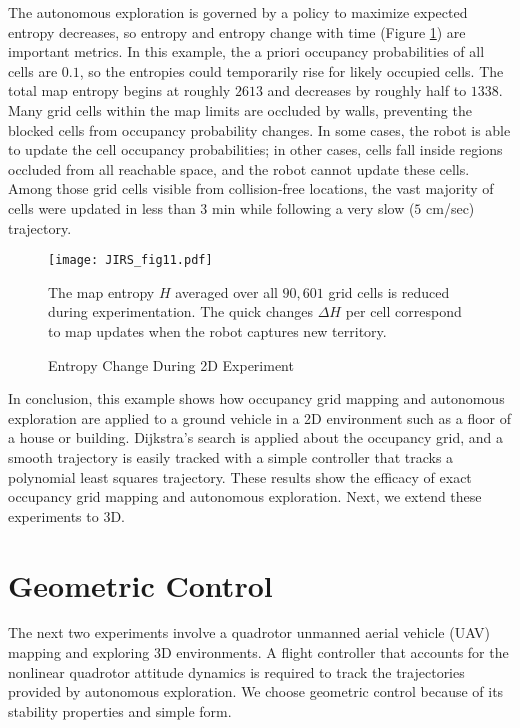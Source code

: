 The autonomous exploration is governed by a policy to maximize expected entropy decreases, so entropy and entropy change with time (Figure \ref{fig:ExperimentH}) are important metrics. In this example, the a priori occupancy probabilities of all cells are $0.1$, so the entropies could temporarily rise for likely occupied cells. The total map entropy begins at roughly $2613$ and decreases by roughly half to $1338$. Many grid cells within the map limits are occluded by walls, preventing the blocked cells from occupancy probability changes. In some cases, the robot is able to update the cell occupancy probabilities; in other cases, cells fall inside regions occluded from all reachable space, and the robot cannot update these cells. Among those grid cells visible from collision-free locations, the vast majority of cells were updated in less than $3$ min while following a very slow ($5$ cm/sec) trajectory.

\begin{figure}
	\centering
	\texttt{[image: JIRS\_fig11.pdf]}
	\caption{Entropy Change During 2D Experiment}
	\medskip
	\small
	The map entropy $H$ averaged over all $90,601$ grid cells is reduced during experimentation. The quick changes $\Delta H$ per cell correspond to map updates when the robot captures new territory.
	\label{fig:ExperimentH}
\end{figure}

In conclusion, this example shows how occupancy grid mapping and autonomous exploration are applied to a ground vehicle in a 2D environment such as a floor of a house or building. Dijkstra's search is applied about the occupancy grid, and a smooth trajectory is easily tracked with a simple controller that tracks a polynomial least squares trajectory. These results show the efficacy of exact occupancy grid mapping and autonomous exploration. Next, we extend these experiments to 3D.


\section{Geometric Control}
\label{sec:GeometricControl}

The next two experiments involve a quadrotor unmanned aerial vehicle (UAV) mapping and exploring 3D environments. A flight controller that accounts for the nonlinear quadrotor attitude dynamics is required to track the trajectories provided by autonomous exploration. We choose geometric control because of its stability properties and simple form.

